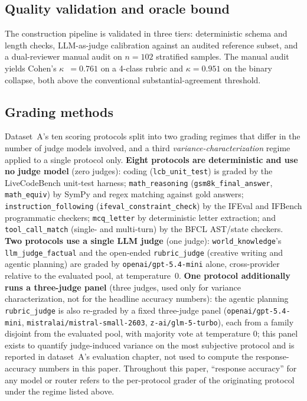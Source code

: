 \documentclass[twocolumn,10pt,a4paper]{article}
\begin{document}
\subsection{Quality validation and oracle bound}
The construction pipeline is validated in three tiers: deterministic schema and length checks, LLM-as-judge calibration against an audited reference subset, and a dual-reviewer manual audit on $n{=}102$ stratified samples. The manual audit yields Cohen's $\kappa$~\cite{cohen1960kappa}${=}0.761$ on a 4-class rubric and $\kappa{=}0.951$ on the binary collapse, both above the conventional substantial-agreement threshold.

\subsection{Grading methods}\label{sec:grading}
Dataset~A's ten scoring protocols split into two grading regimes that differ in the number of judge models involved, and a third \emph{variance-characterization} regime applied to a single protocol only. \textbf{Eight protocols are deterministic and use no judge model} (zero judges): coding (\texttt{lcb\_unit\_test}) is graded by the LiveCodeBench unit-test harness; \texttt{math\_reasoning} (\texttt{gsm8k\_final\_answer}, \texttt{math\_equiv}) by SymPy and regex matching against gold answers; \texttt{instruction\_following} (\texttt{ifeval\_constraint\_check}) by the IFEval and IFBench programmatic checkers; \texttt{mcq\_letter} by deterministic letter extraction; and \texttt{tool\_call\_match} (single- and multi-turn) by the BFCL AST/state checkers. \textbf{Two protocols use a single LLM judge} (one judge): \texttt{world\_knowledge}'s \texttt{llm\_judge\_factual} and the open-ended \texttt{rubric\_judge} (creative writing and agentic planning) are graded by \texttt{openai/gpt-5.4-mini} alone, cross-provider relative to the evaluated pool, at temperature~$0$. \textbf{One protocol additionally runs a three-judge panel} (three judges, used only for variance characterization, not for the headline accuracy numbers): the agentic planning \texttt{rubric\_judge} is also re-graded by a fixed three-judge panel (\texttt{openai/gpt-5.4-mini}, \texttt{mistralai/mistral-small-2603}, \texttt{z-ai/glm-5-turbo}), each from a family disjoint from the evaluated pool, with majority vote at temperature $0$; this panel exists to quantify judge-induced variance on the most subjective protocol and is reported in dataset~A's evaluation chapter, not used to compute the response-accuracy numbers in this paper. Throughout this paper, ``response accuracy'' for any model or router refers to the per-protocol grader of the originating protocol under the regime listed above.
\end{document}
